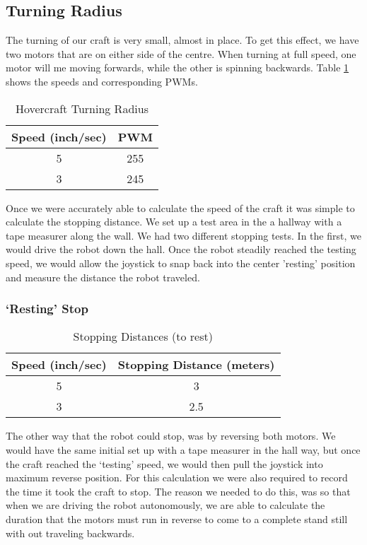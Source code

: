 \subsection{Turning Radius}
The turning of our craft is very small, almost in place. To get this effect, we have two motors that are on either side of the centre. When turning at full speed, one motor will me moving forwards, while the other is spinning backwards. Table \ref{turningRadius} shows the speeds and corresponding PWMs. 

\begin{table}
\caption{Hovercraft Turning Radius}
\begin{center}
\begin{tabular}{ c c }
  Speed (inch/sec) & PWM \\
  \hline
  5 & 255 \\
  3 & 245 \\
\end{tabular}
\end{center}
\label{turningRadius}
\end{table}

Once we were accurately able to calculate the speed of the craft it was simple to calculate the stopping distance. We set up a test area in the a hallway with a tape measurer along the wall. We had two different stopping tests. In the first, we would drive the robot down the hall. Once the robot steadily reached the testing speed, we would allow the joystick to snap back into the center 'resting' position and measure the distance the robot traveled.

\subsubsection{`Resting' Stop}
\begin{table}
\caption{Stopping Distances (to rest)}
\begin{center}
\begin{tabular}{ c c }
  Speed (inch/sec) & Stopping Distance (meters) \\
  \hline
  5 & 3 \\
  3 & 2.5 \\
\end{tabular}
\end{center}
\label{restingTable}
\end{table}

The other way that the robot could stop, was by reversing both motors. We would have the same initial set up with a tape measurer in the hall way, but once the craft reached the `testing' speed, we would then pull the joystick into maximum reverse position. For this calculation we were also required to record the time it took the craft to stop. The reason we needed to do this, was so that when we are driving the robot autonomously, we are able to calculate the duration that the motors must run in reverse to come to a complete stand still with out traveling backwards.

